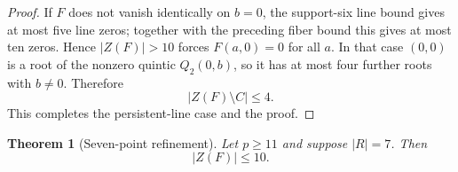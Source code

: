 \documentclass[11pt]{article}
\newtheorem{theorem}{Theorem}[section]
\begin{document}
\begin{proof}
If \(F\) does not vanish identically on \(b=0\), the support-six line bound
gives at most five line zeros; together with the preceding fiber bound this
gives at most ten zeros.  Hence \(|Z(F)|>10\) forces \(F(a,0)=0\) for all
\(a\).  In that case \((0,0)\) is a root of the nonzero quintic
\(Q_2(0,b)\), so it has at most four further roots with \(b\ne0\).  Therefore
\[
 |Z(F)\setminus C|\le4.
\]
This completes the persistent-line case and the proof.
\end{proof}

\begin{theorem}[Seven-point refinement]
\label{thm:seven-point-ten}
Let \(p\ge11\) and suppose \(|R|=7\).  Then
\begin{equation}
 \boxed{|Z(F)|\le10.}
 \label{eq:seven-point-ten}
\end{equation}
\end{theorem}
\end{document}
